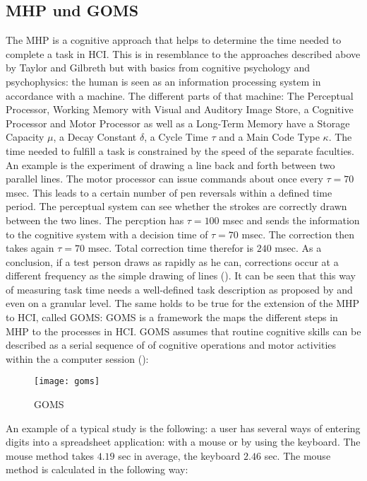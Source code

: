 \subsection{\ac{MHP} und \ac{GOMS}}
The \ac{MHP} is a cognitive approach that helps to determine the time needed to complete a task in \ac{HCI}. This is in resemblance to the approaches described above by Taylor and Gilbreth but with basics from cognitive psychology and psychophysics: the human is seen as an information processing system in accordance with a machine. The different parts of that machine: The Perceptual Processor, Working Memory with Visual and Auditory Image Store, a Cognitive Processor and Motor Processor as well as a Long-Term Memory have a Storage Capacity $\mu$, a Decay Constant $\delta$, a Cycle Time $\tau$ and a Main Code Type $\kappa$. The time needed to fulfill a task is constrained by the speed of the separate faculties. An example is the experiment of drawing a line back and forth between two parallel lines. The motor processor can issue commands about once every $\tau=70$ msec. This leads to a certain number of pen reversals within a defined time period. The perceptual system can see whether the strokes are correctly drawn between the two lines. The percption has $\tau=100$ msec and sends the information to the cognitive system with a decision time of $\tau=70$ msec. The correction then takes again $\tau=70$ msec. Total correction time therefor is $240$ msec. As a conclusion, if a test person draws as rapidly as he can, corrections occur at a different frequency as the simple drawing of lines (\cite{card1986model}). It can be seen that this way of measuring task time needs a well-defined task description as proposed by \cite{annett1967task} and even on a granular level. The same holds to be true for the extension of the \ac{MHP} to \ac{HCI}, called \ac{GOMS}: \ac{GOMS} is a framework the maps the different steps in \ac{MHP} to the processes in \ac{HCI}. \ac{GOMS} assumes that routine cognitive skills can be described as a serial sequence of of cognitive operations and motor activities within the a computer session (\cite{olson1990growth}):



\begin{figure}[ht]
	\centering
  \texttt{[image: goms]}
	\caption{GOMS}
	\label{fig3}
\end{figure}

An example of a typical study is the following: a user has several ways of entering digits into a spreadsheet application: with a mouse or by using the keyboard. The mouse method takes $4.19$ sec in average, the keyboard $2.46$ sec. The mouse method is calculated in the following way:

